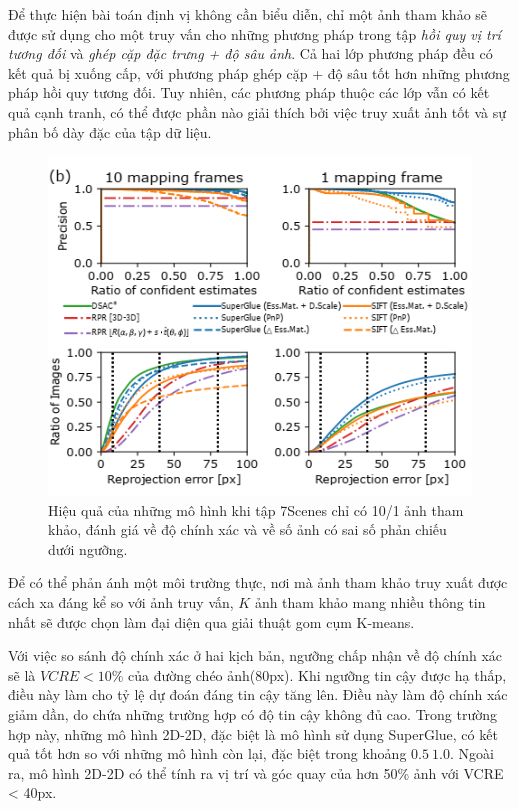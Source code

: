 Để thực hiện bài toán định vị không cần biểu diễn, chỉ một ảnh tham khảo sẽ được sử dụng cho một truy vấn cho những phương pháp trong tập \textit{hồi quy vị trí tương đối} và \textit{ghép cặp đặc trưng + độ sâu ảnh}. Cả hai lớp phương pháp đều có kết quả bị xuống cấp, với phương pháp ghép cặp + độ sâu tốt hơn những phương pháp hồi quy tương đối. Tuy nhiên, các phương pháp thuộc các lớp vẫn có kết quả cạnh tranh, có thể được phần nào giải thích bởi việc truy xuất ảnh tốt và sự phân bố dày đặc của tập dữ liệu.

\begin{figure}[H]
    \centering
    \includegraphics[scale=0.8]{pics/Proposal/partial_7scene.png}
    \caption[Hiệu quả của các mô hình khi giới hạn ảnh tham khảo]{Hiệu quả của những mô hình khi tập 7Scenes chỉ có 10/1 ảnh tham khảo, đánh giá về độ chính xác và về số ảnh có sai số phản chiếu dưới ngưỡng.}
\end{figure}

Để có thể phản ánh một môi trường thực, nơi mà ảnh tham khảo truy xuất được cách xa đáng kể so với ảnh truy vấn, $K$ ảnh tham khảo mang nhiều thông tin nhất sẽ được chọn làm đại diện qua giải thuật gom cụm K-means.

Với việc so sánh độ chính xác ở hai kịch bản, ngưỡng chấp nhận về độ chính xác sẽ là $VCRE<10\%$ của đường chéo ảnh(80px). Khi ngưỡng tin cậy được hạ thấp, điều này làm cho tỷ lệ dự đoán đáng tin cậy tăng lên. Điều này làm độ chính xác giảm dần, do chứa những trường hợp có độ tin cậy không đủ cao. Trong trường hợp này, những mô hình 2D-2D, đặc biệt là mô hình sử dụng SuperGlue, có kết quả tốt hơn so với những mô hình còn lại, đặc biệt trong khoảng $0.5~1.0$. Ngoài ra, mô hình 2D-2D có thể tính ra vị trí và góc quay của hơn 50\% ảnh với VCRE < 40px.

